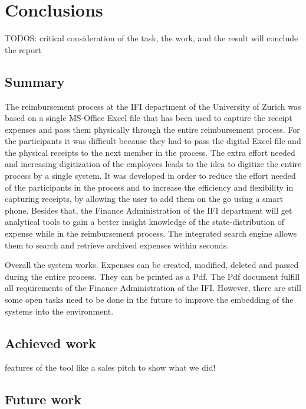 \chapter{Conclusions}

TODOS:
 critical  consideration of the task, the work, and the result will conclude the report
 
 
\section{Summary}

The reimbursement process at the IFI department of the University of Zurich was based on a single MS-Office Excel file that has been used to capture the receipt expenses and pass them physically through the entire reimbursement process. For the participants it was difficult because they had to pass the digital Excel file and the physical receipts to the next member in the process. The extra effort needed and increasing digitization of the employees leads to the idea to digitize the entire process by a single system.\newline
It was developed in order to reduce the effort needed of the participants in the process and to increase the efficiency and flexibility in capturing receipts, by allowing the user to add them on the go using a smart phone. Besides that, the Finance Administration of the IFI department will get analytical tools to gain a better insight knowledge of the state-distribution of expense while in the reimbursement process. The integrated search engine allows them to search and retrieve archived expenses within seconds. \par
Overall the system works. Expenses can be created, modified, deleted and passed during the entire process. They can be printed as a Pdf. The Pdf document fulfill all requirements of the Finance Administration of the IFI. However, there are still some open tasks need to be done in the future to improve the embedding of the systems into the environment.

\section{Achieved work}
	features of the tool like a sales pitch to show what we did!

\section{Future work}
\label{sec:future-work}

